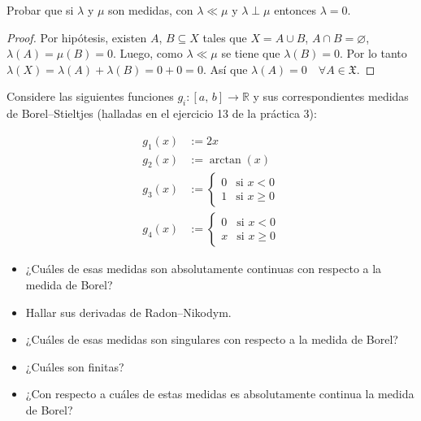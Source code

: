 \documentclass[12pt]{article}
\newenvironment{statement}[2][Ejercicio]{\begin{trivlist}
\item[\hskip \labelsep {\bfseries #1}\hskip \labelsep {\bfseries #2.}]}{\end{trivlist}}
\begin{document}
\begin{statement}{9}
    Probar que si $\lambda$ y $\mu$ son medidas, con $\lambda \ll \mu$ y $\lambda \perp \mu$ entonces $\lambda = 0$.
\end{statement}

\begin{proof}
    Por hipótesis, existen $A$, $B \subseteq X$ tales que $X = A \cup B$, $A \cap B = \varnothing$, $\lambda(A) = \mu(B) = 0$. Luego, como $\lambda \ll \mu$ se tiene que $\lambda(B) = 0$. Por lo tanto $\lambda(X) = \lambda(A) + \lambda(B) = 0 + 0 = 0$. Así que $\lambda(A) = 0 \quad \forall A \in \mathfrak{X}$.
\end{proof}

\begin{statement}{10}
    Considere las siguientes funciones $g_i : [a\text{, }b] \to \mathbb{R}$ y sus correspondientes medidas de Borel–Stieltjes (halladas en el ejercicio 13 de la práctica 3):

    \begin{align*}
        g_1(x) & := 2x                      \\
        g_2(x) & := \arctan(x)              \\
        g_3(x) & := \begin{cases}
                        0 & \text{si } x < 0    \\
                        1 & \text{si } x \geq 0
                    \end{cases} \\
        g_4(x) & := \begin{cases}
                        0 & \text{si } x < 0    \\
                        x & \text{si } x \geq 0
                    \end{cases}
    \end{align*}

    \begin{itemize}
        \item[(a)] ¿Cuáles de esas medidas son absolutamente continuas con respecto a la medida de Borel?
        \item[(b)] Hallar sus derivadas de Radon–Nikodym.
        \item[(c)] ¿Cuáles de esas medidas son singulares con respecto a la medida de Borel?
        \item[(d)] ¿Cuáles son finitas?
        \item[(e)] ¿Con respecto a cuáles de estas medidas es absolutamente continua la medida de Borel?
    \end{itemize}
\end{statement}
\end{document}
